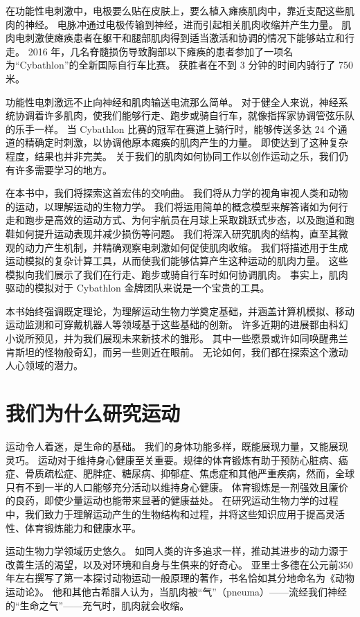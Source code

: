 在功能性电刺激中，电极要么贴在皮肤上，要么植入瘫痪肌肉中，靠近支配这些肌肉的神经。
电脉冲通过电极传输到神经，进而引起相关肌肉收缩并产生力量。
肌肉电刺激使瘫痪患者在躯干和腿部肌肉得到适当激活和协调的情况下能够站立和行走。
2016 年，几名脊髓损伤导致胸部以下瘫痪的患者参加了一项名为“Cybathlon”的全新国际自行车比赛。
获胜者在不到 3 分钟的时间内骑行了 750 米。


功能性电刺激远不止向神经和肌肉输送电流那么简单。
对于健全人来说，神经系统协调着许多肌肉，使我们能够行走、跑步或骑自行车，就像指挥家协调管弦乐队的乐手一样。
当 Cybathlon 比赛的冠军在赛道上骑行时，能够传送多达 24 个通道的精确定时刺激，以协调他原本瘫痪的肌肉产生的力量。
即使达到了这种复杂程度，结果也并非完美。
关于我们的肌肉如何协同工作以创作运动之乐，我们仍有许多需要学习的地方。


在本书中，我们将探索这首宏伟的交响曲。
我们将从力学的视角审视人类和动物的运动，以理解运动的生物力学。
我们将运用简单的概念模型来解答诸如为何行走和跑步是高效的运动方式、为何宇航员在月球上采取跳跃式步态，以及跑道和跑鞋如何提升运动表现并减少损伤等问题。
我们将深入研究肌肉的结构，直至其微观的动力产生机制，并精确观察电刺激如何促使肌肉收缩。
我们将描述用于生成运动模拟的复杂计算工具，从而使我们能够估算产生这种运动的肌肉力量。
这些模拟向我们展示了我们在行走、跑步或骑自行车时如何协调肌肉。
事实上，肌肉驱动的模拟对于 Cybathlon 金牌团队来说是一个宝贵的工具。


本书始终强调既定理论，为理解运动生物力学奠定基础，并涵盖计算机模拟、移动运动监测和可穿戴机器人等领域基于这些基础的创新。
许多近期的进展都由科幻小说所预见，并为我们展现未来新技术的雏形。
其中一些愿景或许如同唤醒弗兰肯斯坦的怪物般奇幻，而另一些则近在眼前。
无论如何，我们都在探索这个激动人心领域的潜力。






\section{我们为什么研究运动}

运动令人着迷，是生命的基础。
我们的身体功能多样，既能展现力量，又能展现灵巧。
运动对于维持身心健康至关重要。规律的体育锻炼有助于预防心脏病、癌症、骨质疏松症、肥胖症、糖尿病、抑郁症、焦虑症和其他严重疾病，然而，全球只有不到一半的人口能够充分活动以维持身心健康。
体育锻炼是一剂强效且廉价的良药，即使少量运动也能带来显著的健康益处。
在研究运动生物力学的过程中，我们致力于理解运动产生的生物结构和过程，并将这些知识应用于提高灵活性、体育锻炼能力和健康水平。


运动生物力学领域历史悠久。
如同人类的许多追求一样，推动其进步的动力源于改善生活的渴望，以及对环境和自身与生俱来的好奇心。
亚里士多德在公元前350年左右撰写了第一本探讨动物运动一般原理的著作，书名恰如其分地命名为《动物运动论》。
他和其他古希腊人认为，当肌肉被“气”（pneuma）——流经我们神经的“生命之气”——充气时，肌肉就会收缩。


